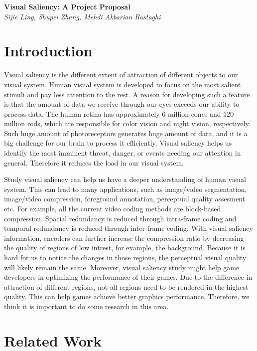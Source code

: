 \documentclass[12pt]{article}
\begin{document}
\begin{center}
{\bf \Large Visual Saliency: A Project Proposal}  \\
\vspace{.1in}
{\em Sijie Ling, Shupei Zhang, Mehdi Akbarian Rastaghi}
\end{center}
\section{Introduction}

Visual saliency is the different extent of attraction of different objects to our visual system. Human visual system
is developed to focus on the most salient stimuli and pay less attention to the rest. A reason for developing such a 
feature is that the amount of data we receive through our eyes exceeds our ability to process data. 
The human retina has approximately 6 million cones and 120 million rods\cite{PhotoreceptorCell2021}, which are responsible for color vision 
and night vision, respectively. Such huge amount of photoreceptors generates huge amount of data, and it is a big challenge for our brain to 
process it efficiently.
Visual saliency helps us identify the most imminent threat, danger, or events needing our attention in general. Therefore it reduces 
the load in our visual system.

Study visual saliency can help us have a deeper understanding of human visual system. This can lead to many applications, such as
image/video segmentation, image/video compression, foreground annotation, perceptual quality assesment etc\cite{congReviewVisualSaliency2019}.
For example, all the current video coding methods are block-based compression. Spacial redundancy is reduced through intra-frame coding and temporal 
redundancy is reduced through inter-frame coding\cite{sullivanOverviewHighEfficiency2012}. With visual saliency information, encoders can further increase
the compression ratio by decreasing the quality of regions of low intrest, for example, the background. Because it is hard for us to notice the changes in those regions,
the perceptual visual quality will likely remain the same. Moreover, visual saliency study might help game developers in optimizing the performance 
of their games. Due to the difference in attraction of different regions, not all regions need to be rendered in the highest quality.
This can help games achieve better graphics performance. Therefore, we think it is important to do some research in this area.
\section{Related Work}
\end{document}
